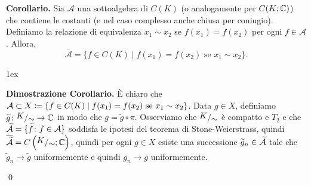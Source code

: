 \textbf{Corollario.}
Sia $\mathcal A$ una sottoalgebra di $C(K)$ (o analogamente per $C(K; \mathbb C)$) che contiene le costanti (e nel caso complesso anche chiusa per coniugio). Definiamo la relazione di equivalenza $x_1 \sim x_2$ se $f(x_1) = f(x_2)$ per ogni $f \in \mathcal A$. Allora,
$$
	\overline{\mathcal A} = \{ f \in C(K) \mid f(x_1) = f(x_2) \text{ se } x_1 \sim x_2 \}.
$$
\begin{minipage}{\textwidth - 2.5em}
\parskip 1ex
\setlength{\parindent}{0pt}

\begin{wrapfigure}{r}{100pt}
	\centering
	\vspace{-1.5\baselineskip}
	\vspace{-1.5\baselineskip}
\end{wrapfigure}

\textbf{Dimostrazione Corollario.}
È chiaro che $\mathcal{A} \subset X \coloneqq \{ f \in C(K) \mid f(x_1) = f(x_2) \text{ se } x_1 \sim x_2 \}$. Data $g \in X$, definiamo $\tilde{g} \colon \sfrac{K}{\sim} \to \C$ in modo che $g = \tilde{g} \circ \pi$.
Osserviamo che $\sfrac{K}{\sim}$ è compatto e $T_2$ e che $\widetilde{\mathcal{A}} = \{\widetilde{f} \colon  f \in \mathcal{A}\}$ soddisfa le ipotesi del teorema di Stone-Weierstrass, quindi $\ol{\tilde{\mc{A}}} = C\left( \sfrac{K}{\sim} ;\C \right)$, quindi per ogni $g \in X$ esiste una successione $\widetilde{g}_n \in \widetilde{\mathcal{A}}$ tale che $\tilde{g}_n \to \tilde{g}$ uniformemente e quindi $g_n \to g$ uniformemente.

\qed
\end{minipage}

\vss

